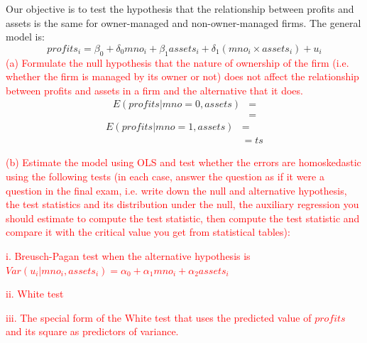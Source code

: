 \documentclass[12pt]{report}
\begin{document}
\vspace{-\baselineskip}
\noindent Our objective is to test the hypothesis that the relationship between profits and assets is the same for owner-managed and non-owner-managed firms. The general model is: $$profits_i = \beta_0 + \delta_0mno_i + \beta_1assets_i + \delta_1 (mno_i \times assets_i) + u_i$$
\noindent \textcolor{red}
{
	(a) Formulate the null hypothesis that the nature of ownership of the firm (i.e. whether the firm is managed by its owner or not) does not affect the relationship between profits and assets in a firm and the alternative that it does.	
}
\begin{align*}
E(profits|mno=0,assets) &= \\
& = 
\end{align*}
\begin{align*}
E(profits|mno=1,assets) &=  \\
& = ts
\end{align*}



\newpage
\noindent \textcolor{red}{(b) Estimate the model using OLS and test whether the errors are homoskedastic using the following tests (in each case, answer the question as if it were a question in the final exam, i.e. write down the null and alternative hypothesis, the test statistics and its distribution under the null, the auxiliary regression you should estimate to compute the test statistic, then compute the test statistic and compare it with the critical value you get from statistical tables):}

\noindent \textcolor{red}{i. Breusch-Pagan test when the alternative hypothesis is $Var(u_i|mno_i , assets_i) = \alpha_0 + \alpha_1 mno_i + \alpha_2 assets_i$}

\noindent \textcolor{red}{ii. White test}

\noindent \textcolor{red}{iii. The special form of the White test that uses the predicted value of $profits$ and its square as predictors of variance.}
\end{document}
